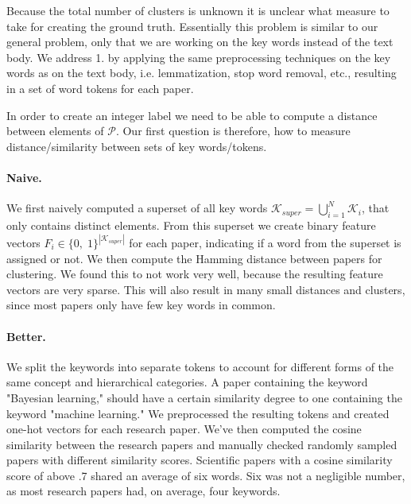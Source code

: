 Because the total number of clusters is unknown it is unclear what measure to take for creating the ground truth. Essentially this problem is similar to our general problem, only that we are working on the key words instead of the text body. We address 1. by applying the same preprocessing techniques on the key words as on the text body, i.e. lemmatization, stop word removal, etc., resulting in a set of word tokens for each paper.

In order to create an integer label we need to be able to compute a distance between elements of $ \mathcal{P} $. Our first question is therefore, how to measure distance/similarity between sets of key words/tokens. 

\paragraph{Naive.}
We first naively computed a superset of all key words $ \mathcal{K}_{super} = \bigcup_{i=1}^{N} \mathcal{K}_{i} $, that only contains distinct elements. From this superset we create binary feature vectors $ F_{i} \in \{0,\; 1 \}^{|\mathcal{K}_{super}|} $ for each paper, indicating if a word from the superset is assigned or not. We then compute the Hamming distance between papers for clustering. We found this to not work very well, because the resulting feature vectors are very sparse. This will also result in many small distances and clusters, since most papers only have few key words in common. 

\paragraph{Better.}
We split the keywords into separate tokens to account for different forms of the same concept and hierarchical categories. A paper containing the keyword "Bayesian learning," should have a certain similarity degree to one containing the keyword "machine learning." We preprocessed the resulting tokens and created one-hot vectors for each research paper. We've then computed the cosine similarity between the research papers and manually checked randomly sampled papers with different similarity scores. Scientific papers with a cosine similarity score of above .7 shared an average of six words. Six was not a negligible number, as most research papers had, on average, four keywords. 

